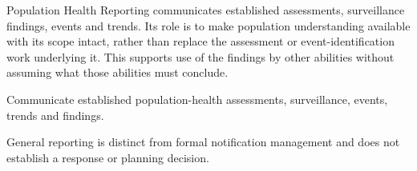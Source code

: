 Population Health Reporting communicates established assessments, surveillance findings, events and trends. Its role is to make population understanding available with its scope intact, rather than replace the assessment or event-identification work underlying it. This supports use of the findings by other abilities without assuming what those abilities must conclude.



Communicate established population-health assessments, surveillance, events, trends and findings.



General reporting is distinct from formal notification management and does not establish a response or planning decision.


